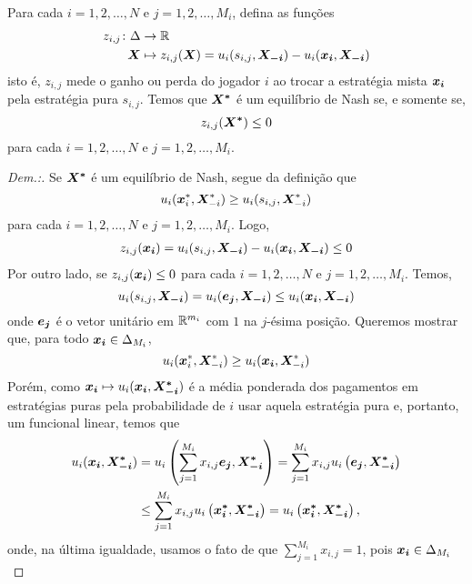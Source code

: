 \begin{theorem}
    Para cada $i=1,2,\dots,N$ e $j=1,2,\dots,M_i$, defina as funções
    \begin{align*}
        \begin{split}
            z_{i,j} \colon \Delta &\to \mathbb{R}\\
            \boldsymbol{X} &\mapsto z_{i,j}(\boldsymbol{X})=u_i(s_{i,j},\boldsymbol{X_{-i}})-u_i(\boldsymbol{x_i},\boldsymbol{X_{-i}})
        \end{split}
    \end{align*}
    isto é, $z_{i,j}$ mede o ganho ou perda do jogador $i$ ao trocar a estratégia mista $\boldsymbol{x_i}$ pela estratégia pura $s_{i,j}$. Temos que $\boldsymbol{X^*}$ é um equilíbrio de Nash se, e somente se,
    \begin{equation*}
        z_{i,j}(\boldsymbol{X^*})\leq 0
    \end{equation*}
    para cada $i=1,2,\dots,N$ e $j=1,2,\dots,M_i$.
\end{theorem}
\begin{proof}[Dem.:]
    Se $\boldsymbol{X^*}$ é um equilíbrio de Nash, segue da definição que
    \begin{equation}
        u_i(\boldsymbol{x}^*_i,\boldsymbol{X}^*_{-i})\geq u_i(s_{i,j},\boldsymbol{X}^*_{-i})
    \end{equation}
    para cada $i=1,2,\dots,N$ e $j=1,2,\dots,M_i$. Logo,
    \begin{multline}
        z_{i,j}(\boldsymbol{x_i})=u_i(s_{i,j},\boldsymbol{X_{-i}})-u_i(\boldsymbol{x_i},\boldsymbol{X_{-i}})\leq 0
    \end{multline}
    Por outro lado, se $z_{i,j}(\boldsymbol{x_i})\leq 0$ para cada $i=1,2,\dots,N$ e $j=1,2,\dots,M_i$. Temos,
    \begin{equation}
        u_i(s_{i,j},\boldsymbol{X_{-i}})=u_i(\boldsymbol{e_j},\boldsymbol{X_{-i}})\leq u_i(\boldsymbol{x_i},\boldsymbol{X_{-i}})
    \end{equation}
    onde $\boldsymbol{e_j}$ é o vetor unitário em $\mathbb{R}^{m_i}$ com $1$ na $j$-ésima posição. Queremos mostrar que, para todo $\boldsymbol{x_i}\in\Delta_{M_i}$,
    \begin{equation}
        u_i(\boldsymbol{x}^*_i,\boldsymbol{X}^*_{-i})\geq u_i(\boldsymbol{x_i},\boldsymbol{X}^*_{-i})
    \end{equation}
    Porém, como $\boldsymbol{x_i}\mapsto u_i(\boldsymbol{x_i},\boldsymbol{X^*_{-i}})$ é a média ponderada dos pagamentos em estratégias puras pela probabilidade de $i$ usar aquela estratégia pura e, portanto, um funcional linear, temos que
    \begin{equation}
    \begin{split}
        u_i(\boldsymbol{x_i},\boldsymbol{X^*_{-i}}) &= u_i\left(\sum_{j=1}^{M_i}x_{i,j}\boldsymbol{e_j},\boldsymbol{X^*_{-i}}\right)
        = \sum_{j=1}^{M_i}x_{i,j}u_i\left(\boldsymbol{e_j},\boldsymbol{X^*_{-i}}\right) \\
        & \leq\sum_{j=1}^{M_i}x_{i,j}u_i\left(\boldsymbol{x_i^*},\boldsymbol{X^*_{-i}}\right)
        = u_i\left(\boldsymbol{x_i^*},\boldsymbol{X^*_{-i}}\right),
    \end{split}
    \end{equation}
    onde, na última igualdade, usamos o fato de que  $\sum_{j=1}^{M_i}x_{i,j}=1$, pois $\boldsymbol{x_i}\in\Delta_{M_i}$
\end{proof}

